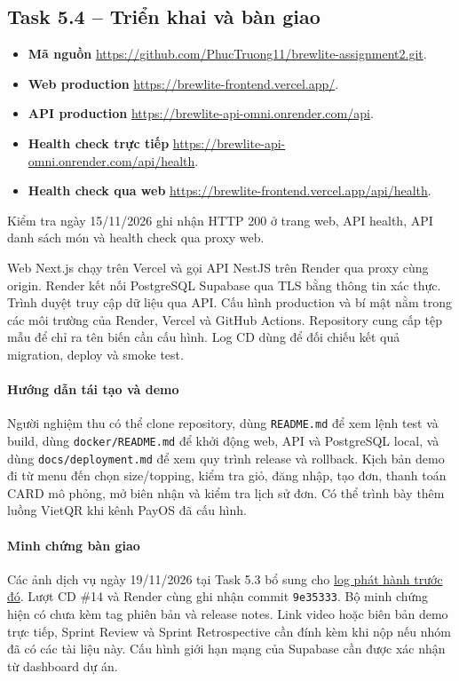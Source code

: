 \subsection{Task 5.4 -- Triển khai và bàn giao}

\begin{itemize}
  \item \textbf{Mã nguồn}
        \url{https://github.com/PhucTruong11/brewlite-assignment2.git}.
  \item \textbf{Web production}
        \url{https://brewlite-frontend.vercel.app/}.
  \item \textbf{API production}
        \url{https://brewlite-api-omni.onrender.com/api}.
  \item \textbf{Health check trực tiếp}
        \url{https://brewlite-api-omni.onrender.com/api/health}.
  \item \textbf{Health check qua web}
        \url{https://brewlite-frontend.vercel.app/api/health}.
\end{itemize}

Kiểm tra ngày 15/11/2026 ghi nhận HTTP 200 ở trang web, API health, API
danh sách món và health check qua proxy web.

Web Next.js chạy trên Vercel và gọi API NestJS trên Render qua proxy cùng
origin. Render kết nối PostgreSQL Supabase qua TLS bằng thông tin xác thực.
Trình duyệt truy cập dữ liệu qua API. Cấu hình production và bí mật nằm trong
các môi trường của Render, Vercel và GitHub Actions. Repository cung cấp tệp
mẫu để chỉ ra tên biến cần cấu hình. Log CD dùng để đối chiếu kết quả migration,
deploy và smoke test.

\paragraph{Hướng dẫn tái tạo và demo}
Người nghiệm thu có thể clone repository, dùng \nolinkurl{README.md} để xem
lệnh test và build, dùng \nolinkurl{docker/README.md} để khởi động web, API và
PostgreSQL local, và dùng \nolinkurl{docs/deployment.md} để xem quy trình
release và rollback. Kịch bản demo đi từ menu đến chọn size/topping, kiểm
tra giỏ, đăng nhập, tạo đơn, thanh toán CARD mô phỏng, mở biên nhận và kiểm
tra lịch sử đơn. Có thể trình bày thêm luồng VietQR khi kênh PayOS đã cấu hình.

\paragraph{Minh chứng bàn giao}
Các ảnh dịch vụ ngày 19/11/2026 tại Task 5.3 bổ sung cho
\href{https://github.com/PhucTruong11/brewlite-assignment2/actions/runs/43554939814}{log phát hành trước đó}.
Lượt CD \#14 và Render cùng ghi nhận commit \texttt{9e35333}.
Bộ minh chứng hiện có chưa kèm tag phiên bản và release notes. Link video hoặc biên
bản demo trực tiếp, Sprint Review và Sprint Retrospective cần đính kèm khi
nộp nếu nhóm đã có các tài liệu này. Cấu hình giới hạn mạng của Supabase
cần được xác nhận từ dashboard dự án.
